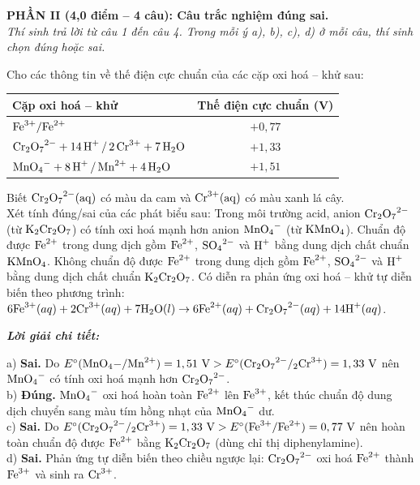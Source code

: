 \documentclass[11pt,a4paper]{article}
\def\loigiai#1{
\par\begingroup\color{blue!80!black}\small
\noindent\textbf{\textit{Lời giải chi tiết:}}\par
#1\par\endgroup}
\begin{document}
\noindent
\textbf{PHẦN II (4,0 điểm -- 4 câu): Câu trắc nghiệm đúng sai.}\\
\textit{Thí sinh trả lời từ câu 1 đến câu 4. Trong mỗi ý a), b), c), d) ở mỗi câu, thí sinh chọn đúng hoặc sai.}

\setcounter{ex}{0}

\begin{ex}
[CĐ – SBT] Cho các thông tin về thế điện cực chuẩn của các cặp oxi hoá – khử sau:
\begin{center}
\renewcommand{\arraystretch}{1.1}
\begin{tabular}{|l|c|}
\hline
\textbf{Cặp oxi hoá -- khử} & \textbf{Thế điện cực chuẩn (V)} \\
\hline
$\ce{Fe^3+/Fe^2+}$ & $+0,77$ \\
\hline
$\ce{Cr2O7^2- + 14H+ / 2Cr^3+ + 7H2O}$ & $+1,33$ \\
\hline
$\ce{MnO4- + 8H+ / Mn^2+ + 4H2O}$ & $+1,51$ \\
\hline
\end{tabular}
\end{center}
Biết $\ce{Cr2O7^2-(aq)}$ có màu da cam và $\ce{Cr^3+(aq)}$ có màu xanh lá cây.\\
Xét tính đúng/sai của các phát biểu sau:
\choiceTF
{Trong môi trường acid, anion $\ce{Cr2O7^2-}$ (từ $\ce{K2Cr2O7}$) có tính oxi hoá mạnh hơn anion $\ce{MnO4-}$ (từ $\ce{KMnO4}$).}
{\True Chuẩn độ được $\ce{Fe^2+}$ trong dung dịch gồm $\ce{Fe^2+}$, $\ce{SO4^2-}$ và $\ce{H+}$ bằng dung dịch chất chuẩn $\ce{KMnO4}$.}
{Không chuẩn độ được $\ce{Fe^2+}$ trong dung dịch gồm $\ce{Fe^2+}$, $\ce{SO4^2-}$ và $\ce{H+}$ bằng dung dịch chất chuẩn $\ce{K2Cr2O7}$.}
{Có diễn ra phản ứng oxi hoá – khử tự diễn biến theo phương trình:\\ $6\ce{Fe^3+}(aq) + 2\ce{Cr^3+}(aq) + 7\ce{H2O}(l) \rightarrow 6\ce{Fe^2+}(aq) + \ce{Cr2O7^2-}(aq) + 14\ce{H+}(aq)$.}
\loigiai{
a) \textbf{Sai.} Do $E^\circ(\ce{MnO4-/Mn^2+}) = 1,51\text{ V} > E^\circ(\ce{Cr2O7^2-/2Cr^3+}) = 1,33\text{ V}$ nên $\ce{MnO4-}$ có tính oxi hoá mạnh hơn $\ce{Cr2O7^2-}$.\\
b) \textbf{Đúng.} $\ce{MnO4-}$ oxi hoá hoàn toàn $\ce{Fe^2+}$ lên $\ce{Fe^3+}$, kết thúc chuẩn độ dung dịch chuyển sang màu tím hồng nhạt của $\ce{MnO4-}$ dư.\\
c) \textbf{Sai.} Do $E^\circ(\ce{Cr2O7^2-/2Cr^3+}) = 1,33\text{ V} > E^\circ(\ce{Fe^3+/Fe^2+}) = 0,77\text{ V}$ nên hoàn toàn chuẩn độ được $\ce{Fe^2+}$ bằng $\ce{K2Cr2O7}$ (dùng chỉ thị diphenylamine).\\
d) \textbf{Sai.} Phản ứng tự diễn biến theo chiều ngược lại: $\ce{Cr2O7^2-}$ oxi hoá $\ce{Fe^2+}$ thành $\ce{Fe^3+}$ và sinh ra $\ce{Cr^3+}$.
}
\end{ex}
\end{document}
